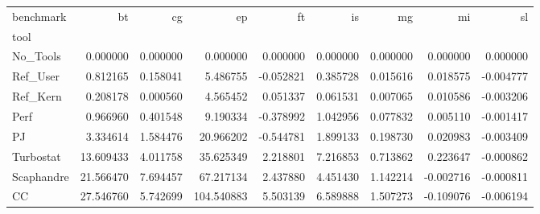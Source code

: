 \begin{tabular}{lrrrrrrrr}
\toprule
benchmark & bt & cg & ep & ft & is & mg & mi & sl \\
tool &  &  &  &  &  &  &  &  \\
\midrule
No_Tools & 0.000000 & 0.000000 & 0.000000 & 0.000000 & 0.000000 & 0.000000 & 0.000000 & 0.000000 \\
Ref_User & 0.812165 & 0.158041 & 5.486755 & -0.052821 & 0.385728 & 0.015616 & 0.018575 & -0.004777 \\
Ref_Kern & 0.208178 & 0.000560 & 4.565452 & 0.051337 & 0.061531 & 0.007065 & 0.010586 & -0.003206 \\
Perf & 0.966960 & 0.401548 & 9.190334 & -0.378992 & 1.042956 & 0.077832 & 0.005110 & -0.001417 \\
PJ & 3.334614 & 1.584476 & 20.966202 & -0.544781 & 1.899133 & 0.198730 & 0.020983 & -0.003409 \\
Turbostat & 13.609433 & 4.011758 & 35.625349 & 2.218801 & 7.216853 & 0.713862 & 0.223647 & -0.000862 \\
Scaphandre & 21.566470 & 7.694457 & 67.217134 & 2.437880 & 4.451430 & 1.142214 & -0.002716 & -0.000811 \\
CC & 27.546760 & 5.742699 & 104.540883 & 5.503139 & 6.589888 & 1.507273 & -0.109076 & -0.006194 \\
\bottomrule
\end{tabular}
